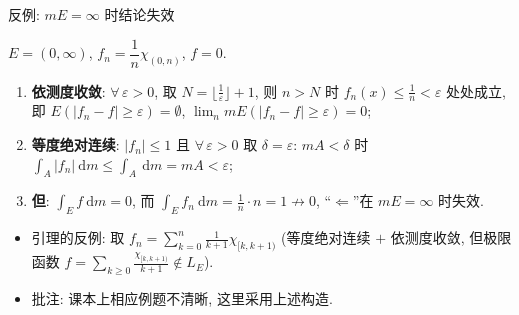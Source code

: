 \begin{frame}{反例: $mE = \infty$ 时结论失效}

\graymode

\begin{eg}
$E = (0, \infty)$, $f_n = \dfrac{1}{n} \chi_{(0, n)}$, $f = 0$.
\end{eg}

\begin{enumerate}
\item \textbf{依测度收敛}: $\forall\, \varepsilon > 0$, 取 $N = \lfloor \tfrac1\varepsilon \rfloor + 1$,
  则 $n > N$ 时 $f_n(x) \leqslant \tfrac1n < \varepsilon$ 处处成立, 即
  $E(|f_n - f| \geqslant \varepsilon) = \emptyset$,
  $\lim_n mE(|f_n - f| \geqslant \varepsilon) = 0$;
\item \textbf{等度绝对连续}: $|f_n| \leqslant 1$ 且 $\forall\, \varepsilon > 0$ 取 $\delta = \varepsilon$:
  $mA < \delta$ 时 $\int_A |f_n| ~ \mathrm{d} m \leqslant \int_A ~ \mathrm{d} m = mA < \varepsilon$;
\item \textbf{但}: $\int_E f ~ \mathrm{d} m = 0$,
  而 $\int_E f_n ~ \mathrm{d} m = \tfrac1n \cdot n = 1 \not\to 0$,
  ``$\Leftarrow$''在 $mE = \infty$ 时失效.
\end{enumerate}

\pause

\begin{itemize}
\item 引理的反例: 取 $f_n = \sum_{k=0}^{n} \frac{1}{k+1} \chi_{[k, k+1)}$
  (等度绝对连续 $+$ 依测度收敛, 但极限函数 $f = \sum_{k \geqslant 0} \frac{\chi_{[k,k+1)}}{k+1} \notin L_E$).
\item 批注: 课本上相应例题不清晰, 这里采用上述构造.
\end{itemize}

\normalmode

\end{frame}


